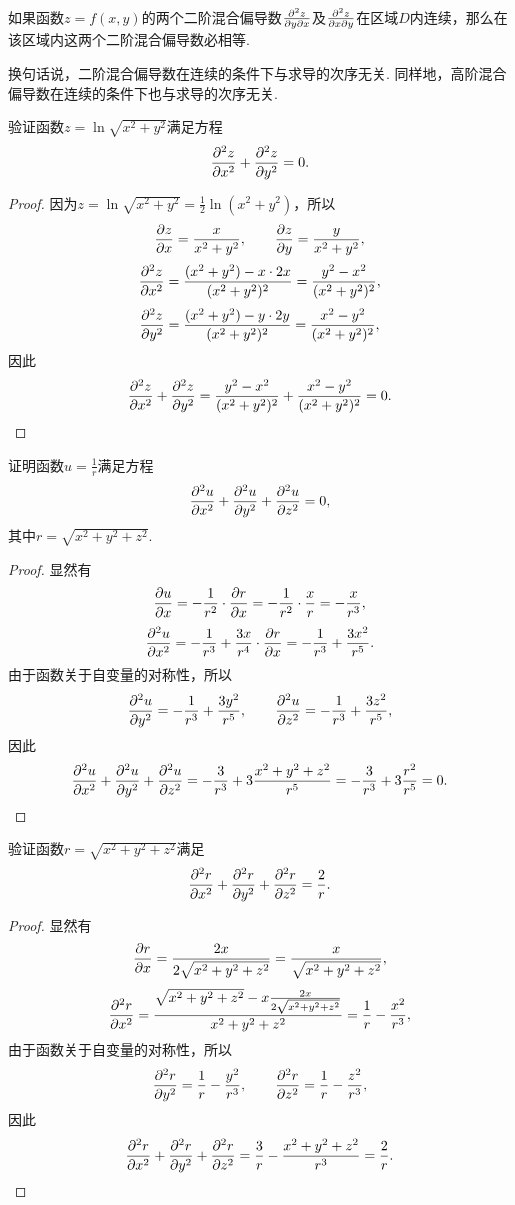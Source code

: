\begin{theorem}
如果函数\(z=f(x,y)\)的两个二阶混合偏导数\(\pdv{z}{y}{x}\)及\(\pdv{z}{x}{y}\)在区域\(D\)内连续，那么在该区域内这两个二阶混合偏导数必相等.
\end{theorem}
换句话说，二阶混合偏导数在连续的条件下与求导的次序无关.
同样地，高阶混合偏导数在连续的条件下也与求导的次序无关.

\begin{example}
验证函数\(z = \ln\sqrt{x^2+y^2}\)满足方程\[
\pdv[2]{z}{x} + \pdv[2]{z}{y} = 0.
\]
\begin{proof}
因为\(z = \ln\sqrt{x^2+y^2} = \frac{1}{2} \ln(x^2+y^2)\)，所以\[
\pdv{z}{x} = \frac{x}{x^2+y^2},
\qquad
\pdv{z}{y} = \frac{y}{x^2+y^2},
\]\[
\pdv[2]{z}{x} = \frac{(x^2+y^2)-x\cdot2x}{(x^2+y^2)^2}
= \frac{y^2-x^2}{(x^2+y^2)^2},
\]\[
\pdv[2]{z}{y} = \frac{(x^2+y^2)-y\cdot2y}{(x^2+y^2)^2}
= \frac{x^2-y^2}{(x^2+y^2)^2},
\]因此\[
\pdv[2]{z}{x} + \pdv[2]{z}{y}
= \frac{y^2-x^2}{(x^2+y^2)^2} + \frac{x^2-y^2}{(x^2+y^2)^2}
= 0.
\qedhere
\]
\end{proof}
\end{example}

\begin{example}
证明函数\(u = \frac{1}{r}\)满足方程\[
\pdv[2]{u}{x} + \pdv[2]{u}{y} + \pdv[2]{u}{z} = 0,
\]其中\(r = \sqrt{x^2+y^2+z^2}\).
\begin{proof}
显然有\[
\pdv{u}{x} = -\frac{1}{r^2}\cdot\pdv{r}{x}
= -\frac{1}{r^2}\cdot\frac{x}{r}
= -\frac{x}{r^3},
\]\[
\pdv[2]{u}{x} = -\frac{1}{r^3} + \frac{3x}{r^4}\cdot\pdv{r}{x}
= -\frac{1}{r^3} + \frac{3x^2}{r^5}.
\]由于函数关于自变量的对称性，所以\[
\pdv[2]{u}{y} = -\frac{1}{r^3} + \frac{3y^2}{r^5},
\qquad
\pdv[2]{u}{z} = -\frac{1}{r^3} + \frac{3z^2}{r^5},
\]因此\[
\pdv[2]{u}{x} + \pdv[2]{u}{y} + \pdv[2]{u}{z}
= -\frac{3}{r^3} + 3\frac{x^2+y^2+z^2}{r^5}
= -\frac{3}{r^3} + 3\frac{r^2}{r^5} = 0.
\qedhere
\]
\end{proof}
\end{example}

\begin{example}
验证函数\(r = \sqrt{x^2+y^2+z^2}\)满足\[
\pdv[2]{r}{x} + \pdv[2]{r}{y} + \pdv[2]{r}{z} = \frac{2}{r}.
\]
\begin{proof}
显然有\[
\pdv{r}{x} = \frac{2x}{2\sqrt{x^2+y^2+z^2}} = \frac{x}{\sqrt{x^2+y^2+z^2}},
\]\[
\pdv[2]{r}{x} = \frac{\sqrt{x^2+y^2+z^2}-x\frac{2x}{2\sqrt{x^2+y^2+z^2}}}{x^2+y^2+z^2}
= \frac{1}{r} - \frac{x^2}{r^3},
\]由于函数关于自变量的对称性，所以\[
\pdv[2]{r}{y} = \frac{1}{r} - \frac{y^2}{r^3},
\qquad
\pdv[2]{r}{z} = \frac{1}{r} - \frac{z^2}{r^3},
\]因此\[
\pdv[2]{r}{x} + \pdv[2]{r}{y} + \pdv[2]{r}{z}
= \frac{3}{r} - \frac{x^2+y^2+z^2}{r^3}
= \frac{2}{r}.
\qedhere
\]
\end{proof}
\end{example}

